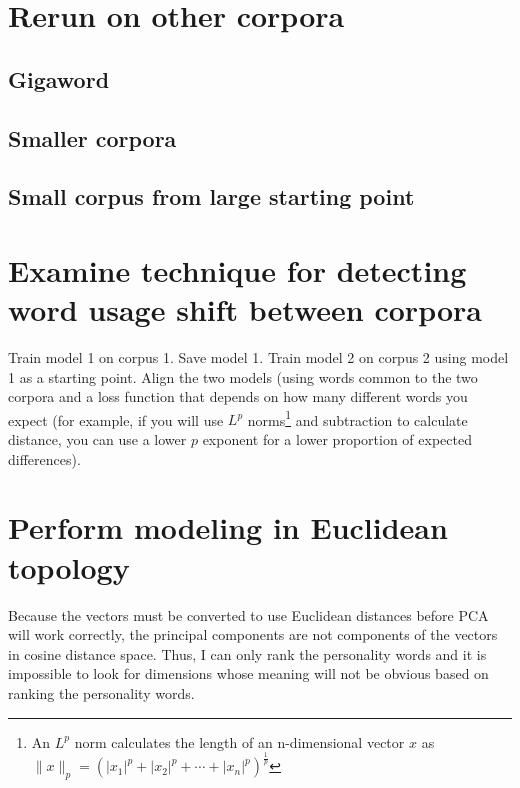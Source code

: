 \documentclass[eric_thesis.tex]{subfiles}
\begin{document}

\section{Rerun on other corpora}

\subsection{Gigaword}
\subsection{Smaller corpora}
\subsection{Small corpus from large starting point}

\section{Examine technique for detecting word usage shift between corpora}

Train model 1 on corpus 1. Save model 1. Train model 2 on corpus 2 using model 1 as a starting point. Align the two models (using words common to the two corpora and a loss function that depends on how many different words you expect (for example, if you will use $L^p$ norms\footnote{An $L^p$ norm calculates the length of an n-dimensional vector $x$ as $\|x\|_p=\left(|x_1|^p+|x_2|^p+\dotsb+|x_n|^p\right)^{\frac{1}{p}}$} and subtraction to calculate distance, you can use a lower $p$ exponent for a lower proportion of expected differences).

\section{Perform modeling in Euclidean topology}

Because the vectors must be converted to use Euclidean distances before PCA will work correctly, the principal components are not components of the vectors in cosine distance space. Thus, I can only rank the personality words and it is impossible to look for dimensions whose meaning will not be obvious based on ranking the personality words.
\end{document}

